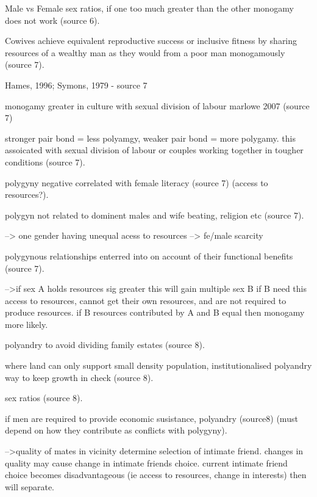 Male vs Female sex ratios, if one too much greater than the other monogamy does not work (source 6).

Cowives achieve equivalent reproductive success or inclusive fitness by sharing resources of a wealthy man as they would from a poor man monogamously (source 7).

Hames, 1996; Symons, 1979 - source 7

monogamy greater in culture with sexual division of labour marlowe 2007 (source 7)

stronger pair bond = less polyamgy, weaker pair bond = more polygamy. this assoicated with sexual division of labour or couples working together in tougher conditions (source 7).

polygyny negative correlated with female literacy (source 7) (access to resources?).

polygyn not related to dominent males and wife beating, religion etc (source 7).

--> one gender having unequal acess to resources
--> fe/male scarcity

polygynous relationships enterred into on account of their functional benefits (source 7).

-->if sex A holds resources sig greater this will gain multiple sex B if B need this access to resources, cannot get their own resources, and are not required to produce resources. if B resources contributed by A and B equal then monogamy more likely.

polyandry to avoid dividing family estates (source 8).

where land can only support small density population, institutionalised polyandry way to keep growth in check (source 8).

sex ratios (source 8).

if men are required to provide economic susistance, polyandry (source8) (must depend on how they contribute as conflicts with polygyny).  

-->quality of mates in vicinity determine selection of intimate friend. changes in quality may cause change in intimate friends choice. current intimate friend choice becomes disadvantageous (ie access to resources, change in interests) then will separate.




